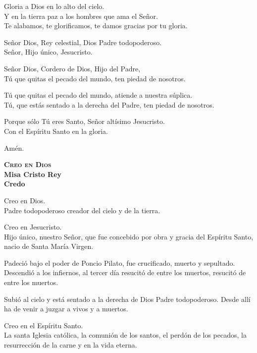 \documentclass[letterpaper]{report}
\begin{document}
    \LARGE Gloria a Dios en lo alto del cielo.\\
    Y en la tierra paz a los hombres que ama el Se\~nor. \\
    Te alabamos, te glorificamos, te damos gracias por tu gloria.
    
    Se\~nor Dios, Rey celestial, Dios Padre todopoderoso. \\
    Se\~nor, Hijo \'unico, Jesucristo.
    
    Se\~nor Dios, Cordero de Dios, Hijo del Padre, \\
    T\'u que quitas el pecado del mundo, ten piedad de nosotros.
    
    T\'u que quitas el pecado del mundo, atiende a nuestra s\'uplica. \\
    T\'u, que est\'as sentado a la derecha del Padre, ten piedad de nosotros.
    
    Porque s\'olo T\'u eres Santo, Se\~nor alt\'isimo Jesucristo. \\
    Con el Esp\'iritu Santo en la gloria.
    
    Am\'en.
    \clearpage

    \begin{center}
        {\scshape \Huge {\bfseries Creo en Dios}} \\
        {\LARGE {\bfseries Misa Cristo Rey}} \\
        {\Large {\bfseries Credo}}
    \end{center}
    
    \LARGE Creo en Dios. \\
    Padre todopoderoso creador del cielo y de la tierra.
    
    Creo en Jesucristo. \\
    Hijo \'unico, nuestro Se\~nor, que fue concebido por obra y gracia del Esp\'iritu Santo, nacio de Santa Mar\'ia Virgen.
    
    Padeci\'o bajo el poder de Poncio Pilato, fue crucificado, muerto y sepultado. Descendi\'o a los infiernos, al tercer d\'ia resucit\'o de entre los muertos, resucit\'o de entre los muertos.
    
    Subi\'o al cielo y est\'a sentado a la derecha de Dios Padre todopoderoso. Desde all\'i ha de venir a juzgar a vivos y a muertos.
    
    Creo en el Esp\'iritu Santo. \\
    La santa Iglesia cat\'olica, la comuni\'on de los santos, el perd\'on de los pecados, la resurrecci\'on de la carne y en la vida eterna.
    
\end{document}
